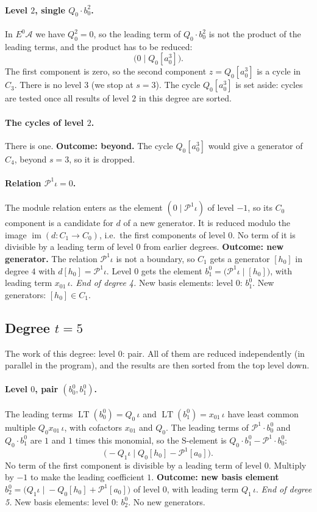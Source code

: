 \documentclass[11pt]{article}
\renewcommand{\P}{\mathcal{P}}
\newcommand{\A}{\mathcal{A}}
\DeclareMathOperator{\LT}{LT}
\begin{document}
\paragraph{Level $2$, single $Q_{0}\cdot b^{2}_{0}$.} In $E^0\A$ we have $Q_{0}^2 = 0$, so the leading term of $Q_{0}\cdot b^{2}_{0}$ is not the product of the leading terms, and the product has to be reduced:
\[\bigl(0 \;\big|\; Q_{0}[a_0^3]\bigr).\]
The first component is zero, so the second component $z = Q_{0}[a_0^3]$ is a cycle in $C_{3}$.
There is no level $3$ (we stop at $s = 3$).
The cycle $Q_{0}[a_0^3]$ is set aside: cycles are tested once all results of level $2$ in this degree are sorted.
\medskip
\paragraph{The cycles of level $2$.} There is one.
\textbf{Outcome: beyond.} The cycle $Q_{0}[a_0^3]$ would give a generator of $C_{4}$, beyond $s = 3$, so it is dropped.
\medskip
\paragraph{Relation $\P^{1}\iota = 0$.} The module relation enters as the element $(0 \mid \P^{1}\iota)$ of level $-1$, so its $C_0$ component is a candidate for $d$ of a new generator. It is reduced modulo the image $\operatorname{im}(d\colon C_1\to C_0)$, i.e.\ the first components of level $0$.
No term of it is divisible by a leading term of level $0$ from earlier degrees.
\textbf{Outcome: new generator.} The relation $\P^{1}\iota$ is not a boundary, so $C_{1}$ gets a generator $[h_0]$ in degree $4$ with $d[h_0] = \P^{1}\iota$.
Level $0$ gets the element $b^{0}_{1} = \bigl(\P^{1}\iota \;\big|\; [h_0]\bigr)$, with leading term $x_{01}\,\iota$.
\medskip\noindent\emph{End of degree 4.} New basis elements: level $0$: $b^{0}_{1}$. New generators: $[h_0]\in C_{1}$.
\subsection*{Degree $t = 5$}
\noindent The work of this degree: level $0$: pair. All of them are reduced independently (in parallel in the program), and the results are then sorted from the top level down.
\medskip
\paragraph{Level $0$, pair $(b^{0}_{0}, b^{0}_{1})$.} The leading terms $\LT(b^{0}_{0}) = Q_{0}\,\iota$ and $\LT(b^{0}_{1}) = x_{01}\,\iota$ have least common multiple $Q_{0}x_{01}\,\iota$, with cofactors $x_{01}$ and $Q_{0}$.
The leading terms of $\P^{1}\cdot b^{0}_{0}$ and $Q_{0}\cdot b^{0}_{1}$ are $1$ and $1$ times this monomial, so the S-element is $Q_{0}\cdot b^{0}_{1} - \P^{1}\cdot b^{0}_{0}$:
\[\bigl(-Q_{1}\iota \;\big|\; Q_{0}[h_0] - \P^{1}[a_0]\bigr).\]
No term of the first component is divisible by a leading term of level $0$.
Multiply by $-1$ to make the leading coefficient $1$.
\textbf{Outcome: new basis element} $b^{0}_{2} = \bigl(Q_{1}\iota \;\big|\; -Q_{0}[h_0] + \P^{1}[a_0]\bigr)$ of level $0$, with leading term $Q_{1}\,\iota$.
\medskip\noindent\emph{End of degree 5.} New basis elements: level $0$: $b^{0}_{2}$. No new generators.
\end{document}
